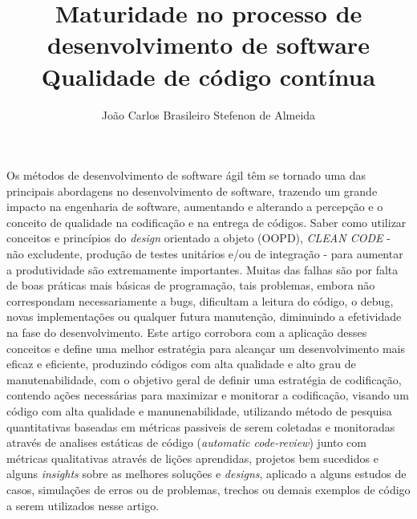 \documentclass[12pt]{article}
\title{Maturidade no processo de desenvolvimento de software\\ Qualidade de código contínua }
\author{João Carlos Brasileiro Stefenon de Almeida\inst{1}}
\begin{document}
 


\maketitle

  
\begin{resumo} 
Os métodos de desenvolvimento de software ágil têm se tornado uma das principais abordagens no desenvolvimento de software, trazendo um grande impacto na engenharia de software, aumentando e alterando a percepção e o conceito de qualidade na codificação e na entrega de códigos.
Saber como utilizar conceitos e princípios do \textit{design} orientado a objeto (OOPD), \textit{CLEAN CODE} - não excludente, produção de testes unitários e/ou de integração - para aumentar a produtividade são extremamente importantes.
Muitas das falhas são por falta de boas práticas mais básicas de programação, tais problemas, embora não correspondam necessariamente a bugs, dificultam a leitura do código, o debug, novas implementações ou qualquer futura manutenção, diminuindo a efetividade na fase do desenvolvimento.
Este artigo corrobora com a aplicação desses conceitos e define uma melhor estratégia para alcançar um desenvolvimento mais eficaz e eficiente, produzindo códigos com alta qualidade e alto grau de manutenabilidade, com o objetivo geral de definir uma estratégia de codificação, contendo ações necessárias para maximizar e monitorar a codificação, visando um código com alta qualidade e manunenabilidade, utilizando método de pesquisa quantitativas baseadas em métricas passiveis de serem coletadas e monitoradas através de analises estáticas de código (\textit{automatic code-review}) junto com métricas qualitativas através de lições aprendidas, projetos   bem sucedidos e alguns \textit{insights} sobre as melhores soluções e \textit{designs}, aplicado a alguns estudos de casos, simulações de erros ou de problemas, trechos ou demais exemplos de código a serem utilizados nesse artigo. 
\end{resumo}
\end{document}
